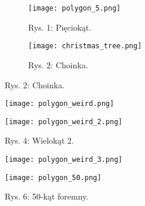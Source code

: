 \begin{figure}[!h]
    \centering
    \begin{subfigure}{.5\textwidth}
      \centering
      \texttt{[image: polygon\_5.png]}
      \caption*{Rys. 1: Pięciokąt.}
      \label{fig:sub1}
    \end{subfigure}%
    \begin{subfigure}{.5\textwidth}
      \centering
      \texttt{[image: christmas\_tree.png]}
      \caption*{Rys. 2: Choinka.}
      \label{fig:sub2}
    \end{subfigure}
    \label{fig:test}
    \end{figure}

\newpage

    \begin{figure}[!h]
    \centering
    \begin{minipage}{.5\textwidth}
      \centering
      \texttt{[image: polygon\_weird.png]}
      \caption*{Rys. 3: Wielokąt 1.}
      \label{fig:test1}
    \end{minipage}%
    \begin{minipage}{.5\textwidth}
      \centering
      \texttt{[image: polygon\_weird\_2.png]}
      \caption*{Rys. 4: Wielokąt 2.}
      \label{fig:test2}
    \end{minipage}
    \end{figure}
    \begin{figure}[!h]
        \centering
        \begin{minipage}{.5\textwidth}
          \centering
          \texttt{[image: polygon\_weird\_3.png]}
          \caption*{Rys. 5: Wielokąt 3.}
          \label{fig:test1}
        \end{minipage}%
        \begin{minipage}{.5\textwidth}
          \centering
          \texttt{[image: polygon\_50.png]}
          \caption*{Rys. 6: 50-kąt foremny.}
          \label{fig:test2}
        \end{minipage}
        \end{figure}